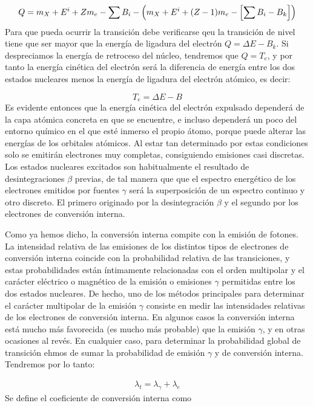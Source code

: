 \begin{equation}
	Q = m_X + E^i + Zm_e - \sum B_i - \left( m_X + E^i + (Z-1)m_e - \left[ \sum B_i - B_k \right] \right)
\end{equation}
Para que pueda ocurrir la transición debe verificarse qeu la transición de nivel tiene que ser mayor que la energía de ligadura del electrón $Q=\Delta E - B_k$. Si despreciamos la energía de retroceso del núcleo, tendremos que $Q=T_e$, y por tanto la energía cinética del electrón será la diferencia de energía entre los dos estados nucleares menos la energía de ligadura del electrón atómico, es decir:

\begin{equation}
	T_e = \Delta E - B
\end{equation}
Es evidente entonces que la energía cinética del electrón expulsado dependerá de la capa atómica concreta en que se encuentre, e incluso dependerá un poco del entorno químico en el que esté inmerso el propio átomo, porque puede alterar las energías de los orbitales atómicos. Al estar tan determinado por estas condiciones solo se emitirán electrones muy completas, consiguiendo emisiones casi discretas. Los estados nucleares excitados son habitualmente el resultado de desintegraciones $\beta$ previas, de tal manera que que el espectro energético de los electrones emitidos por fuentes $\gamma$ será la superposición de un espectro continuo y otro discreto. El primero originado por la desintegración $\beta$ y el segundo por los electrones de conversión interna.

Como ya hemos dicho, la conversión interna compite con la emisión de fotones. La intensidad relativa de las emisiones de los distintos tipos de electrones de conversión interna coincide con la probabilidad relativa de las transiciones, y estas probabilidades están íntimamente relacionadas con el orden multipolar y el carácter eléctrico o magnético de la emisión o emisiones $\gamma$ permitidas entre los dos estados nucleares. De hecho, uno de los métodos principales para determinar el carácter multipolar de la emisión $\gamma$ consiste en medir las intensidades relativas de los electrones de conversión interna. En algunos casos la conversión interna está mucho más favorecida (es mucho más probable) que la emisión $\gamma$, y en otras ocasiones al revés. En cualquier caso, para determinar la probabilidad global de transición ehmos de sumar la probabilidad de emisión $\gamma$ y de conversión interna. Tendremos por lo tanto:

\begin{eqnarray}
	\lambda_t = \lambda_\gamma + \lambda_e
\end{eqnarray}
Se define el coeficiente de conversión interna como

